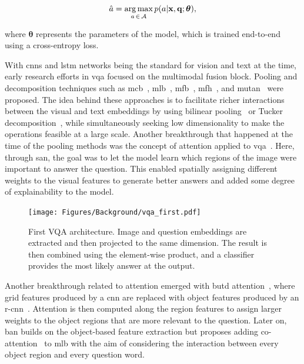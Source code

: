 \begin{equation}
    \hat{a} = \operatorname*{arg\,max}_{a \, \in \, \mathcal{A}} p(a | \mathbf{x}, \mathbf{q}; \bm{\theta}),
\end{equation}

where $\bm{\theta}$ represents the parameters of the model, which is trained end-to-end using a cross-entropy loss.

With \glspl{cnn} and \gls{lstm} networks being the standard for vision and text at the time, early research efforts in \gls{vqa} focused on the multimodal fusion block. Pooling and decomposition techniques such as \gls{mcb}~\cite{fukui2016multimodal}, \gls{mlb}~\cite{kim2018bilinear}, \gls{mfb}~\cite{yu2017multi}, \gls{mfh}~\cite{yu2018beyond}, and \gls{mutan}~\cite{ben2017mutan} were proposed. The idea behind these approaches is to facilitate richer interactions between the visual and text embeddings by using bilinear pooling~\cite{fukui2016multimodal,kim2018bilinear,yu2017multi,yu2017multi} or Tucker decomposition~\cite{ben2017mutan}, while simultaneously seeking low dimensionality to make the operations feasible at a large scale. Another breakthrough that happened at the time of the pooling methods was the concept of attention applied to \gls{vqa}~\cite{yang2016stacked}. Here, through \gls{san}, the goal was to let the model learn which regions of the image were important to answer the question. This enabled spatially assigning different weights to the visual features to generate better answers and added some degree of explainability to the model.

\begin{figure}[!ht]
\begin{center}
\texttt{[image: Figures/Background/vqa\_first.pdf]}
\caption{First VQA architecture. Image and question embeddings are extracted and then projected to the same dimension. The result is then combined using the element-wise product, and a classifier provides the most likely answer at the output.}
\label{fig:vqa_first}
\end{center}
\end{figure}

Another breakthrough related to attention emerged with \gls{butd} attention~\cite{anderson2018bottom}, where grid features produced by a \gls{cnn} are replaced with object features produced by an \gls{r-cnn}~\cite{ren2015faster}. Attention is then computed along the region features to assign larger weights to the object regions that are more relevant to the question. Later on, \gls{ban} builds on the object-based feature extraction but proposes adding co-attention~\cite{xu2016ask} to \gls{mlb} with the aim of considering the interaction between every object region and every question word.

